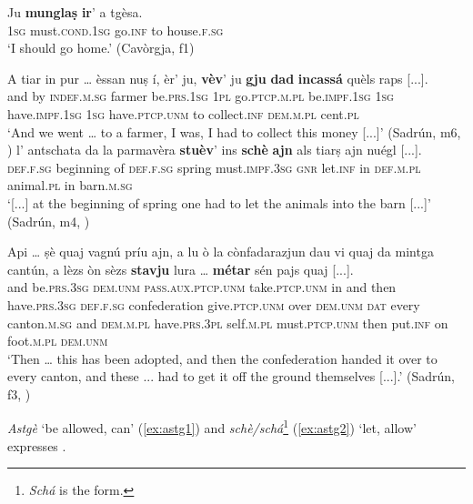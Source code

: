 \ea\label{ex:mung1}
\gll  Ju \textbf{munglaṣ} \textbf{ir}' a tgèsa.\\
\textsc{1sg}  must.\textsc{cond.1sg} go.\textsc{inf} to house.\textsc{f.sg} \\
\glt `I should go home.' (Cavòrgja, f1)
\z

\ea\label{ex:vajda1}
\gll    A tiar in pur … èssan nuṣ í, èr’ ju, \textbf{vèv}’ ju \textbf{gju} \textbf{dad} \textbf{incassá} quèls raps [...].\\ 
and by \textsc{indef.m.sg} farmer {} be.\textsc{prs.1sg} \textsc{1pl} go.\textsc{ptcp.m.pl}  be.\textsc{impf.1sg} \textsc{1sg}  have.\textsc{impf.1sg} \textsc{1sg} have.\textsc{ptcp.unm} to collect.\textsc{inf}  \textsc{dem.m.pl} cent.\textsc{pl}\\
\glt `And we went … to a farmer, I was, I had to collect this money [...]' (Sadrún, m6, )
\z
\ea
\label{ex:stuaj1}
\gll  [...] l’ antschata da la parmavèra \textbf{stuèv}’ ins \textbf{schè} \textbf{ajn} als tiarṣ ajn nuégl [...]. \\
{} \textsc{def.f.sg} beginning of \textsc{def.f.sg} spring must.\textsc{impf.3sg} \textsc{gnr} let.\textsc{inf} in \textsc{def.m.pl} animal.\textsc{pl} in barn.\textsc{m.sg}\\
\glt `[...] at the beginning of spring one had to let the animals into the barn [...]' (Sadrún, m4, )
\z

\ea
\label{ex:stuaj2}
\gll Api … ṣè quaj vagnú príu ajn, a lu ò la cònfadarazjun dau vi quaj da mintga cantún, a lèzs òn sèzs \textbf{stavju} lura … \textbf{métar} sén pajs quaj [...].\\
and {} be.\textsc{prs.3sg} \textsc{dem.unm} \textsc{pass.aux.ptcp.unm} take.\textsc{ptcp.unm} in and then have.\textsc{prs.3sg} \textsc{def.f.sg} confederation give.\textsc{ptcp.unm} over \textsc{dem.unm} \textsc{dat} every canton.\textsc{m.sg} and \textsc{dem.m.pl} have.\textsc{prs.3pl} self.\textsc{m.pl} must.\textsc{ptcp.unm} then {} put.\textsc{inf} on foot.\textsc{m.pl} \textsc{dem.unm}\\

\glt `Then … this has been adopted, and then the confederation handed it over to every canton, and these ... had  to get it off the ground themselves [...].' (Sadrún, f3, )
\z

\textit{Astgè} `be allowed, can' (\ref{ex:astg1}) and \textit{schè/schá}\footnote{\textit{Schá} is the  form.} (\ref{ex:astg2}) `let, allow' expresses .

